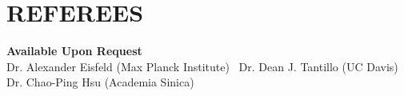 \section{\sc REFEREES}

{\bf Available Upon Request} \\
Dr. Alexander Eisfeld (Max Planck Institute) \textbar\  Dr. Dean J. Tantillo (UC Davis) \textbar \\  
Dr. Chao-Ping Hsu (Academia Sinica)


\endinput